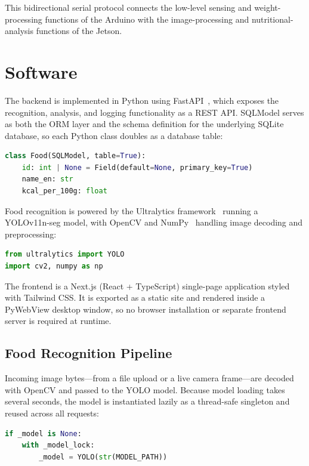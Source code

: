 \documentclass[11pt,a4paper]{article}
\begin{document}
This bidirectional serial protocol connects the low-level sensing and weight-processing functions of the Arduino with the image-processing and nutritional-analysis functions of the Jetson.

\section{Software}

The backend is implemented in Python using FastAPI~\cite{fastapi}, which exposes the recognition, analysis, and logging functionality as a REST API. SQLModel serves as both the ORM layer and the schema definition for the underlying SQLite database, so each Python class doubles as a database table:

\begin{lstlisting}[language=Python]
class Food(SQLModel, table=True):
    id: int | None = Field(default=None, primary_key=True)
    name_en: str
    kcal_per_100g: float
\end{lstlisting}

Food recognition is powered by the Ultralytics framework~\cite{ultralytics} running a YOLOv11n-seg model, with OpenCV and NumPy~\cite{opencv} handling image decoding and preprocessing:

\begin{lstlisting}[language=Python]
from ultralytics import YOLO
import cv2, numpy as np
\end{lstlisting}

The frontend is a Next.js (React + TypeScript) single-page application styled with Tailwind CSS. It is exported as a static site and rendered inside a PyWebView desktop window, so no browser installation or separate frontend server is required at runtime.

\subsection{Food Recognition Pipeline}

Incoming image bytes---from a file upload or a live camera frame---are decoded with OpenCV and passed to the YOLO model. Because model loading takes several seconds, the model is instantiated lazily as a thread-safe singleton and reused across all requests:

\begin{lstlisting}[language=Python]
if _model is None:
    with _model_lock:
        _model = YOLO(str(MODEL_PATH))
\end{lstlisting}
\end{document}
